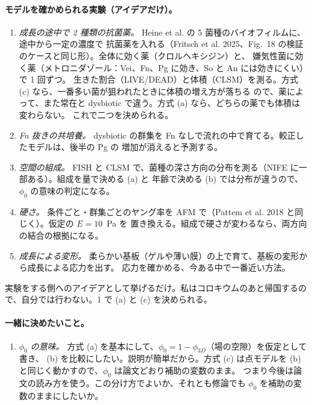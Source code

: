 \documentclass[11pt,a4paper]{article}
\begin{document}
\paragraph{モデルを確かめられる実験（アイデアだけ）。}
\begin{enumerate}
\item \emph{成長の途中で 2 種類の抗菌薬。} Heine et al. の 5 菌種のバイオフィルムに、途中から一定の濃度で
  抗菌薬を入れる（Fritsch et al. 2025、Fig.~18 の検証のケースと同じ形）。全体に効く薬（クロルヘキシジン）と、
  嫌気性菌に効く薬（メトロニダゾール：Vei、Fn、Pg に効き、So と An には効きにくい）で 1 回ずつ。
  生きた割合（LIVE/DEAD）と体積（CLSM）を測る。方式 (c) なら、一番多い菌が狙われたときに体積の増え方が落ちる
  ので、薬によって、また常在と dysbiotic で違う。方式 (a) なら、どちらの薬でも体積は変わらない。
  これで二つを決められる。
\item \emph{Fn 抜きの共培養。} dysbiotic の群集を Fn なしで流れの中で育てる。較正したモデルは、後半の Pg の
  増加が消えると予測する。
\item \emph{空間の組成。} FISH と CLSM で、菌種の深さ方向の分布を測る（NIFE に一部ある）。組成を量で決める (a) と
  年齢で決める (b) では分布が違うので、$\phi_0$ の意味の判定になる。
\item \emph{硬さ。} 条件ごと・群集ごとのヤング率を AFM で（Pattem et al. 2018 と同じく）。仮定の $E=10$~Pa を
  置き換える。組成で硬さが変わるなら、両方向の結合の根拠になる。
\item \emph{成長による変形。} 柔らかい基板（ゲルや薄い膜）の上で育て、基板の変形から成長による応力を出す。
  応力を確かめる、今ある中で一番近い方法。
\end{enumerate}
実験をする側へのアイデアとして挙げるだけ。私はコロキウムのあと帰国するので、自分では行わない。1 で (a) と (c) を決められる。

\paragraph{一緒に決めたいこと。}
\begin{enumerate}
\item[] \emph{$\phi_0$ の意味。} 方式 (a) を基本にして、$\phi_0=1-\phi_{3D}$（場の空隙）を仮定として書き、
  (b) を比較にしたい。説明が簡単だから。方式 (c) は点モデルを (b) と同じく動かすので、$\phi_0$ は論文どおり補助の変数のまま。
  つまり今後は論文の読み方を使う。この分け方でよいか、それとも修論でも $\phi_0$ を補助の変数のままにしたいか。
\end{enumerate}
\end{document}
